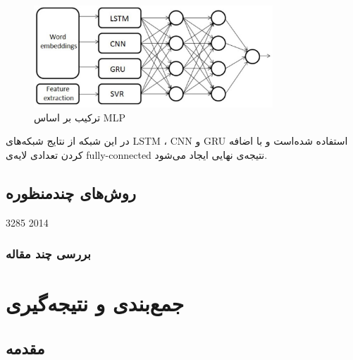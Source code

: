 \documentclass[12pt, a4paper, oneside]{report}
\begin{document}
\begin{figure}[!ht]
    \centering
    \includegraphics[width=0.8\textwidth]{MLPENSEMBLE}
    \caption{ ترکیب بر اساس MLP }
    \label{fig:MLP-ensemble}
\end{figure}

در این شبکه از نتایج شبکه‌های
LSTM
،
CNN
و 
GRU
استفاده شده‌است و با اضافه کردن تعدادی لایه‌ی
fully-connected
نتیجه‌ی نهایی ایجاد می‌شود.

\section{ روش‌های چندمنظوره }

\cite{kalchbrenner-etal-2014-convolutional} 3285 2014

\subsection{بررسی چند مقاله}


\chapter{جمع‌بندی و نتیجه‌گیری}
\pagebreak
\section{مقدمه}

\begin{latin}
    
\end{latin}
\end{document}
